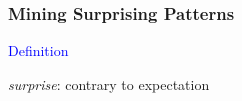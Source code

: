 \documentclass{beamer}
\begin{document}
\begin{frame}
  \frametitle{Mining Surprising Patterns}






  
  \textcolor{blue}{Definition}
  \begin{center}\emph{surprise}: \alert{contrary to expectation}\end{center}


\end{frame}
\end{document}
